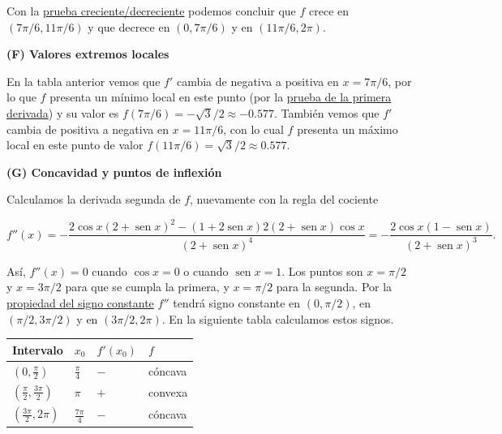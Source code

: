 \documentclass[
  letterpaper,
]{book}
\theoremstyle{plain}
\theoremstyle{remark}
\begin{document}
\begin{tcolorbox}
Con la \hyperref[teo-prueba-cd]{prueba creciente/decreciente} podemos
concluir que \(f\) crece en \((7\pi/6, 11\pi/6)\) y que decrece en
\((0, 7\pi/6)\) y en \((11\pi/6, 2\pi)\).

\textbf{(F) Valores extremos locales}

En la tabla anterior vemos que \(f'\) cambia de negativa a positiva en
\(x=7\pi/6\), por lo que \(f\) presenta un mínimo local en este punto
(por la \hyperref[teo-prueba-primerader]{prueba de la primera derivada})
y su valor es \(f(7\pi/6)=-\sqrt{3}/2\approx -0.577\). También vemos que
\(f'\) cambia de positiva a negativa en \(x=11\pi/6\), con lo cual \(f\)
presenta un máximo local en este punto de valor
\(f(11\pi/6)=\sqrt{3}/2\approx 0.577\).

\textbf{(G) Concavidad y puntos de inflexión}

Calculamos la derivada segunda de \(f\), nuevamente con la regla del
cociente

\[
f''(x)=-\frac{2\cos x(2+\operatorname{sen} x)^2-(1+2\operatorname{sen} x)2(2+\operatorname{sen} x)\cos x}{(2+\operatorname{sen} x)^4}=-\frac{2\cos x(1-\operatorname{sen} x)}{(2+\operatorname{sen} x)^3}.
\]

Así, \(f''(x)=0\) cuando \(\cos x=0\) o cuando
\(\operatorname{sen} x=1\). Los puntos son \(x=\pi/2\) y \(x=3\pi/2\)
para que se cumpla la primera, y \(x=\pi/2\) para la segunda. Por la
\hyperref[teo-propiedad-signoconst]{propiedad del signo constante}
\(f''\) tendrá signo constante en \((0,\pi/2)\), en \((\pi/2,3\pi/2)\) y
en \((3\pi/2, 2\pi)\). En la siguiente tabla calculamos estos signos.

\begin{longtable}[]{@{}
  >{\raggedright\arraybackslash}p{}
  >{\raggedright\arraybackslash}p{}
  >{\raggedright\arraybackslash}p{}
  >{\raggedright\arraybackslash}p{}@{}}
\toprule\noalign{}
\begin{minipage}[b]{\linewidth}\raggedright
Intervalo
\end{minipage} & \begin{minipage}[b]{\linewidth}\raggedright
\(x_0\)
\end{minipage} & \begin{minipage}[b]{\linewidth}\raggedright
\(f'(x_0)\)
\end{minipage} & \begin{minipage}[b]{\linewidth}\raggedright
\(f\)
\end{minipage} \\
\midrule\noalign{}
\endhead
\bottomrule\noalign{}
\endlastfoot
\(\displaystyle \left(0, \frac{\pi}{2}\right)\) &
\(\displaystyle\frac{\pi}{4}\) & \(-\) & cóncava \\
\(\displaystyle \left(\frac{\pi}{2}, \frac{3\pi}{2}\right)\) & \(\pi\) &
\(+\) & convexa \\
\(\displaystyle \left(\frac{3\pi}{2}, 2\pi\right)\) &
\(\displaystyle\frac{7\pi}{4}\) & \(-\) & cóncava \\
\end{longtable}


\end{tcolorbox}
\end{document}
